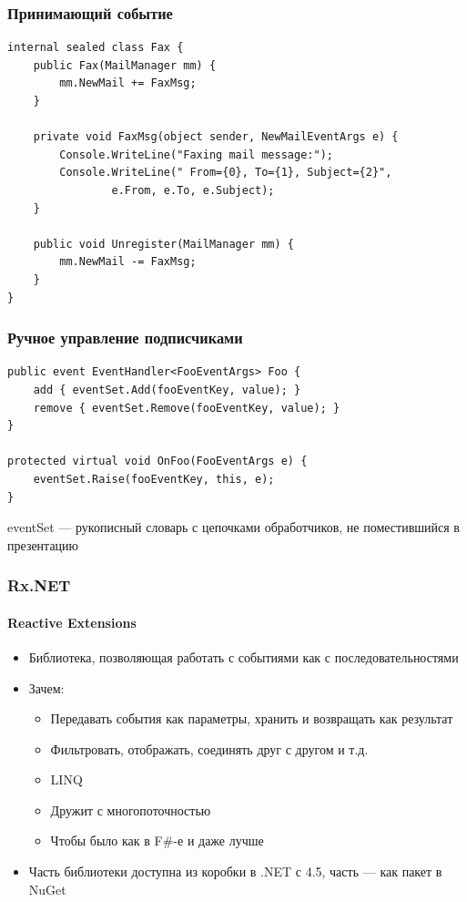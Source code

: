 \documentclass[xetex,mathserif,serif]{beamer}
\begin{document}
	\begin{frame}[fragile]
		\frametitle{Принимающий событие}
		\begin{verbatim}
internal sealed class Fax {
    public Fax(MailManager mm) {
        mm.NewMail += FaxMsg;
    }

    private void FaxMsg(object sender, NewMailEventArgs e) {
        Console.WriteLine("Faxing mail message:");
        Console.WriteLine(" From={0}, To={1}, Subject={2}",
                e.From, e.To, e.Subject);
    }

    public void Unregister(MailManager mm) {
        mm.NewMail -= FaxMsg;
    }
}
		\end{verbatim}
	\end{frame}

	\begin{frame}[fragile]
		\frametitle{Ручное управление подписчиками}
		\begin{verbatim}
public event EventHandler<FooEventArgs> Foo {
    add { eventSet.Add(fooEventKey, value); }
    remove { eventSet.Remove(fooEventKey, value); }
}

protected virtual void OnFoo(FooEventArgs e) {
    eventSet.Raise(fooEventKey, this, e);
}
		\end{verbatim}
		\vspace{7mm}
		eventSet --- рукописный словарь с цепочками обработчиков, не поместившийся в презентацию
	\end{frame}

	\begin{frame}
		\frametitle{Rx.NET}
		\framesubtitle{Reactive Extensions}
		\begin{itemize}
			\item Библиотека, позволяющая работать с событиями как с последовательностями
			\item Зачем:
			\begin{itemize}
				\item Передавать события как параметры, хранить и возвращать как результат
				\item Фильтровать, отображать, соединять друг с другом и т.д.
				\item LINQ
				\item Дружит с многопоточностью
				\item Чтобы было как в F\#-е и даже лучше
			\end{itemize}
			\item Часть библиотеки доступна из коробки в .NET с 4.5, часть --- как пакет в NuGet
		\end{itemize}
	\end{frame}
\end{document}
